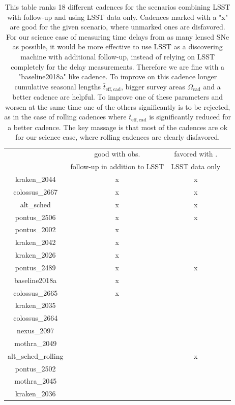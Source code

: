 \begin{table}
\centering
\begin{tabular}{c|c|c|c}
& good with obs.   &  favored with . \\
& follow-up in addition to LSST  & LSST data only \\
\hline
kraken\_2044 & x & x  \\
\hline
colossus\_2667 & x & x   \\
\hline
alt\_sched & x & x    \\
\hline
pontus\_2506 & x & x \\
\hline
pontus\_2002 & x &    \\
\hline
kraken\_2042  & x &   \\
\hline
kraken\_2026 & x &   \\
\hline
pontus\_2489 & x & x  \\
\hline
baseline2018a & x &      \\
\hline
colossus\_2665 & x &    \\
\hline
kraken\_2035 &  &     \\
\hline
colossus\_2664 & &     \\
\hline
nexus\_2097 &  &   \\
\hline
mothra\_2049 & &   \\
\hline
alt\_sched\_rolling & &x    \\
\hline
pontus\_2502 &&    \\
\hline
mothra\_2045 & &   \\
\hline
kraken\_2036 & &   \\
\end{tabular}
\caption{This table ranks 18 different cadences for the scenarios combining LSST with follow-up and using LSST data only. Cadences marked with a "x" are good for the given scenario, where unmarked ones are disfavored. For our science case of measuring time delays from as many lensed SNe as possible, it would be more effective to use LSST as a discovering machine with additional follow-up, instead of relying on LSST completely for the delay measurements. Therefore we are fine with a "baseline2018a" like cadence. To improve on this cadence longer cumulative seasonal lengths $\bar{t}_\mathrm{eff,cad}$, bigger survey areas $\Omega_\mathrm{cad}$ and a better cadence are helpful. To improve one of these parameters and worsen at the same time one of the others significantly is to be rejected, as in the case of rolling cadences where $\bar{t}_\mathrm{eff,cad}$ is significantly reduced for a better cadence. The key massage is that most of the cadences are ok for our science case, where rolling cadences are clearly disfavored.}
\label{tab: favoured strategies}
\end{table}
%
\FloatBarrier
